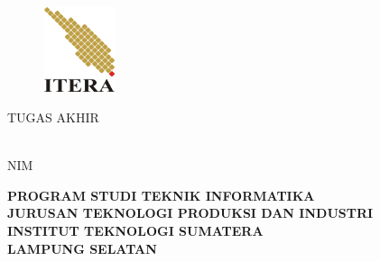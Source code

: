 \clearpage
\pagestyle{empty}

\begin{center}
\smallskip

    \begin{figure}[h]
    	\centering
    	\includegraphics[width=2.1cm, height=2.5cm, keepaspectratio]{resources/itera-logo}
    \end{figure}

	\Large \bfseries \MakeUppercase{\thetitle}
	\vfill

    \Large \uppercase{Tugas Akhir}
    \vfill

    \large \normalfont \theauthor\\
    NIM \printnim
    \vfill

    \large \bfseries
    \uppercase{
        Program Studi Teknik Informatika \\
        Jurusan Teknologi Produksi dan Industri\\
        Institut Teknologi Sumatera\\
        Lampung Selatan
    }\medskip

    \thedate

\end{center}

\clearpage
